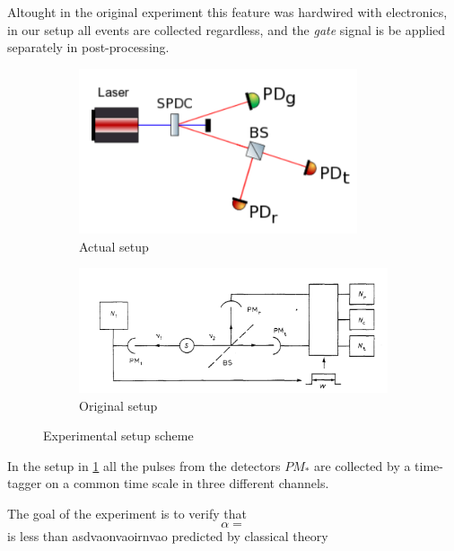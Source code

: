 \documentclass[10pt, final]{article}
\begin{document}
\begin{multicols}{2}
Altought in the original experiment this feature was hardwired with electronics, in our setup all events are collected regardless, and the \emph{gate} signal is be applied separately in post-processing.
\begin{mdframed}
    \begin{figure}[H]
        \begin{subfigure}{\textwidth}
            \centering
            \includegraphics[width = 0.9\textwidth]{../images/our_setup.png}
            \caption{Actual setup}
            \label{our}
        \end{subfigure}

        \begin{subfigure}{\textwidth}
            \centering
            \includegraphics[width = \textwidth]{../images/original.png}
            \caption{Original setup}
        \end{subfigure}
        \caption{Experimental setup scheme}
    \end{figure}
\end{mdframed}
In the setup in \ref{our} all the pulses from the detectors $PM_*$ are collected by a time-tagger on a common time scale in three different channels.

The goal of the experiment is to verify that 
\begin{equation}
    \alpha = 
\end{equation}
is less than asdvaonvaoirnvao predicted by classical theory


\end{multicols}
\end{document}
